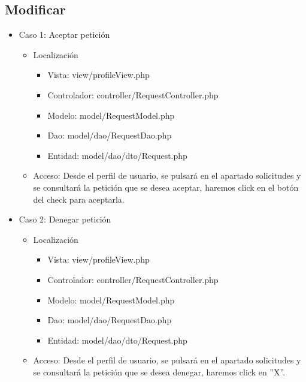 \subsection{Modificar}
\begin{itemize}
\item Caso 1: Aceptar petici\'{o}n
\begin{itemize}
\item Localizaci\'{o}n
\begin{itemize}
\item Vista: view/profileView.php
\item Controlador: controller/RequestController.php
\item Modelo: model/RequestModel.php
\item Dao: model/dao/RequestDao.php
\item Entidad: model/dao/dto/Request.php
\end{itemize}
\item Acceso: Desde el perfil de usuario, se pulsar\'{a} en el apartado solicitudes y se consultar\'{a} la petici\'{o}n que se desea aceptar, haremos click en el bot\'{o}n del check para aceptarla.
\end{itemize}
\item Caso 2: Denegar petici\'{o}n
\begin{itemize}
\item Localizaci\'{o}n
\begin{itemize}
\item Vista: view/profileView.php
\item Controlador: controller/RequestController.php
\item Modelo: model/RequestModel.php
\item Dao: model/dao/RequestDao.php
\item Entidad: model/dao/dto/Request.php
\end{itemize}
\item Acceso: Desde el perfil de usuario, se pulsar\'{a} en el apartado solicitudes y se consultar\'{a} la petici\'{o}n que se desea denegar, haremos click en ''X''.
\end{itemize}
\end{itemize}

